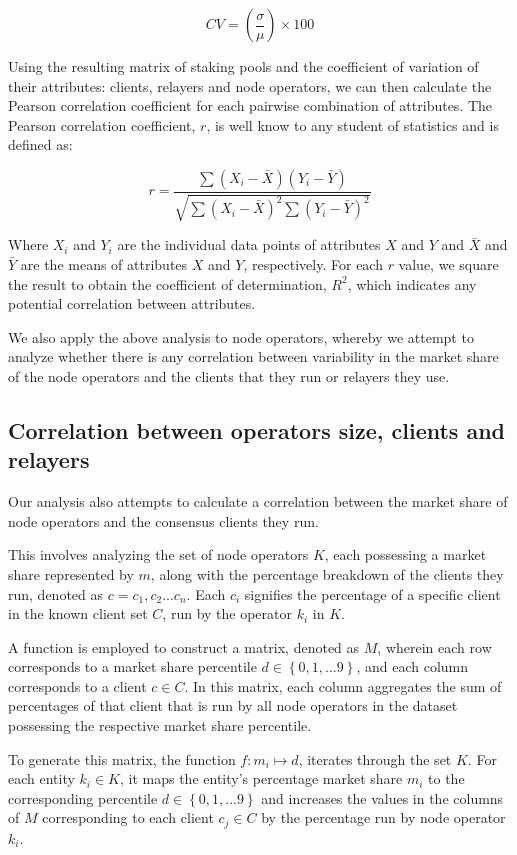 \documentclass[conference]{IEEEtran}
\begin{document}
\[ CV = \left( \frac{\sigma}{\mu} \right) \times 100 \]

Using the resulting matrix of staking pools and the coefficient of variation of their attributes: clients, relayers and node operators, we can then calculate the Pearson correlation coefficient for each pairwise combination of attributes.  The Pearson correlation coefficient, $r$, is well know to any student of statistics and is defined as:

\[
r = \frac{\sum{(X_i - \bar{X})(Y_i - \bar{Y})}}{\sqrt{\sum{(X_i - \bar{X})^2}\sum{(Y_i - \bar{Y})^2}}}
\]

\vspace{3pt}

Where $X_i$ and $Y_i$ are the individual data points of attributes $X$ and $Y$ and $\bar{X}$ and $\bar{Y}$ are the means of attributes $X$ and $Y$, respectively.  For each $r$ value, we square the result to obtain the coefficient of determination, $R^2$, which indicates any potential correlation between attributes.

We also apply the above analysis to node operators, whereby we attempt to analyze whether there is any correlation between variability in the market share of the node operators and the clients that they run or relayers they use.

\subsection{Correlation between operators size, clients and relayers}

Our analysis also attempts to calculate a correlation between the market share of node operators and the consensus clients they run.

This  involves analyzing the set of node operators $K$, each possessing a market share represented by $m$, along with the percentage breakdown of the clients they run, denoted as $c = { c_1, c_2 . . . c_n }$. Each $c_i$ signifies the percentage of a specific client in the known client set $C$, run by the operator $k_i$ in $K$.

A function is employed to construct a matrix, denoted as $M$, wherein each row corresponds to a market share percentile $d \in \left\{0, 1, ... 9\right\}$, and each column corresponds to a client $c \in C$. In this matrix, each column aggregates the sum of percentages of that client that is run by all node operators in the dataset possessing the respective market share percentile.

To generate this matrix, the function $f: m_i \mapsto d$, iterates through the set $K$. For each entity $k_i \in K$, it maps the entity's percentage market share $m_i$ to the corresponding percentile $d \in \left\{0, 1, ... 9\right\}$ and increases the values in the columns of $M$ corresponding to each client $c_j \in C$ by the percentage run by node operator $k_i$.
\end{document}
